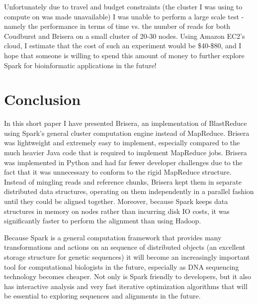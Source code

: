 \documentclass[conference,letterpaper,11pt]{IEEEtran}
\begin{document}
    Unfortunately due to travel and budget constraints (the cluster I was using to compute on was made unavailable) I was unable to perform a large scale test - namely the performance in terms of time vs. the number of reads for both Coudburst and Brisera on a small cluster of 20-30 nodes. Using Amazon EC2's cloud, I estimate that the cost of such an experiment would be \$40-\$80, and I hope that someone is willing to spend this amount of money to further explore Spark for bioinformatic applications in the future! 


\section{Conclusion}
	
    In this short paper I have presented Brisera, an implementation of BlastReduce using Spark's general cluster computation engine instead of MapReduce. Brisera was lightweight and extremely easy to implement, especially compared to the much heavier Java code that is required to implement MapReduce jobs. Brisera was implemented in Python and had far fewer developer challenges due to the fact that it was unnecessary to conform to the rigid MapReduce structure. Instead of mingling reads and reference chunks, Brisera kept them in separate distributed data structures, operating on them independently in a parallel fashion until they could be aligned together. Moreover, because Spark keeps data structures in memory on nodes rather than incurring disk IO costs, it was significantly faster to perform the alignment than using Hadoop. 
    
    Because Spark is a general computation framework that provides many transformations and actions on an sequence of distributed objects (an excellent storage structure for genetic sequences) it will become an increasingly important tool for computational biologists in the future, especially as DNA sequencing technology becomes cheaper. Not only is Spark friendly to developers, but it also has interactive analysis and very fast iterative optimization algorithms that will be essential to exploring sequences and alignments in the future. 
    



\end{document}
